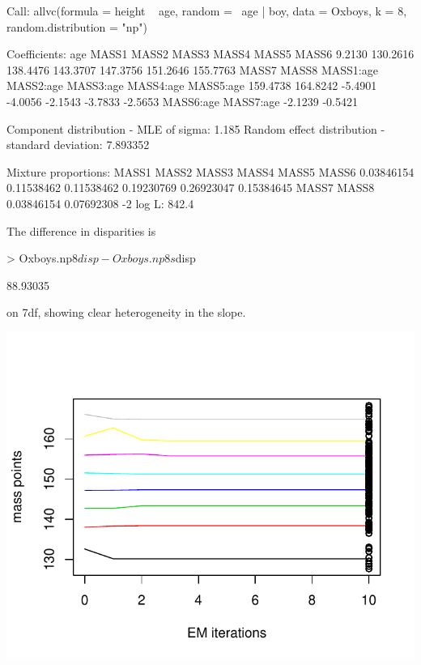 \documentclass[a4paper]{article}
\begin{document}
\begin{landscape}
\begin{Schunk}
\begin{Soutput}
Call:  allvc(formula = height ~ age, random = ~age | boy, data = Oxboys,      k = 8, random.distribution = "np") 

Coefficients:
      age      MASS1      MASS2      MASS3      MASS4      MASS5      MASS6  
   9.2130   130.2616   138.4476   143.3707   147.3756   151.2646   155.7763  
    MASS7      MASS8  MASS1:age  MASS2:age  MASS3:age  MASS4:age  MASS5:age  
 159.4738   164.8242    -5.4901    -4.0056    -2.1543    -3.7833    -2.5653  
MASS6:age  MASS7:age  
  -2.1239    -0.5421  

Component distribution - MLE of sigma:	   1.185 
Random effect distribution - standard deviation:	   7.893352 

Mixture proportions:
     MASS1       MASS2       MASS3       MASS4       MASS5       MASS6  
0.03846154  0.11538462  0.11538462  0.19230769  0.26923047  0.15384645  
     MASS7       MASS8  
0.03846154  0.07692308  
-2 log L:	    842.4 
\end{Soutput}
\end{Schunk}
 The difference in disparities is
\begin{Schunk}
\begin{Sinput}
> Oxboys.np8$disp - Oxboys.np8s$disp
\end{Sinput}
\begin{Soutput}
[1] 88.93035
\end{Soutput}
\end{Schunk}
 on 7df, showing clear heterogeneity in the slope.
 
 
 \begin{minipage}{21cm}
\includegraphics{npmlreg-v-042}
 

\end{minipage}
\end{landscape}
\end{document}
